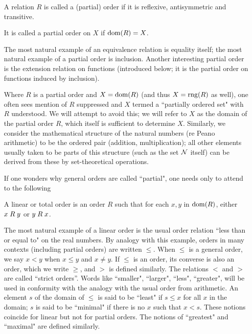 \begin{definition}
 A relation $R$ is called a {\upshape (partial) order\/} if it is reflexive,
 antisymmetric and transitive.

 It is called a
 {\upshape partial order on $X$} if $\mathop{\mathrm{dom}}(R) = X$.
\end{definition}

The most natural example of an equivalence relation is 
equality itself; the most natural example of a partial order is
inclusion.  Another interesting partial order is the extension
relation on functions (introduced below; it is
the partial order on functions induced by inclusion).

Where $R$ is a partial order and $X = \mathop{\mathrm{dom}}(R)$ (and thus 
$X = \mathop{\mathrm{rng}}(R)$ as well), one often sees mention of $R$ suppressed and $X$
termed a ``partially ordered set" with $R$ understood.  We will
attempt to avoid this; we will refer to $X$ as the domain of the
partial order $R$, which itself is sufficient to determine $X$.
Similarly, we consider the mathematical structure of the natural numbers (re Peano arithmetic) to be the ordered pair (addition,
multiplication); all other elements usually taken to be parts of this
structure (such as the set ${\cal N}$ itself) can be derived from these
by set-theoretical operations.

If one wonders why general orders are called ``partial", one
needs only to attend to the following 

\begin{definition}
 A {\upshape linear} or {\upshape total} order
 is an order $R$ such that for each $x,y$ in $\mathop{\mathrm{dom}}(R)$, either $x \mathrel{R} y$ or $y
 \mathrel{R} x$.
\end{definition}

The most natural example of a linear order is the usual order
relation ``less than or equal to" on the real numbers.  By
analogy with this example, orders in many contexts (including partial orders)
are written $\leq$.  When $\leq$ is a general order, we say $x < y$ when $x
\leq y$ and $x \neq y$.  If $\leq$ is an order, its converse is also an order, which we write $\geq$, and $>$ is defined
similarly.  The relations $<$ and $>$ are called ``strict orders''.  Words like ``smaller", ``larger", ``less",
``greater", will be used in conformity with the analogy with the usual
order from arithmetic.  An element $s$ of the domain of $\leq$ is
said to be ``least" if $s \leq x$ for all $x$ in the domain; $s$ is said to be
``minimal" if there is no $x$ such that $x < s$.  These notions coincide for
linear
but not for partial orders. The notions of ``greatest"
and ``maximal" are defined similarly.

